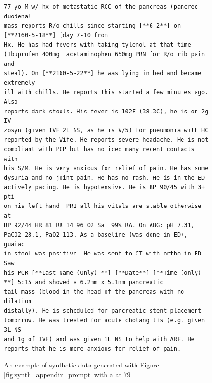 \begin{figure}[hbt]
    \centering
    \begin{Verbatim}[breaklines=true, frame=single]
77 yo M w/ hx of metastatic RCC of the pancreas (pancreo-duodenal
mass reports R/o chills since starting [**6-2**] on [**2160-5-18**] (day 7-10 from
Hx. He has had fevers with taking tylenol at that time
(Ibuprofen 400mg, acetaminophen 650mg PRN for R/o rib pain and
steal). On [**2160-5-22**] he was lying in bed and became extremely
ill with chills. He reports this started a few minutes ago. Also
reports dark stools. His fever is 102F (38.3C), he is on 2g IV
zosyn (given IVF 2L NS, as he is V/5) for pneumonia with HC
reported by the Wife. He reports severe headache. He is not
compliant with PCP but has noticed many recent contacts with
his S/M. He is very anxious for relief of pain. He has some
dysuria and no joint pain. He has no rash. He is in the ED
actively pacing. He is hypotensive. He is BP 90/45 with 3+ pti
on his left hand. PRI all his vitals are stable otherwise at
BP 92/44 HR 81 RR 14 96 O2 Sat 99% RA. On ABG: pH 7.31,
PaCO2 28.1, PaO2 113. As a baseline (was done in ED), guaiac
in stool was positive. He was sent to CT with ortho in ED. Saw
his PCR [**Last Name (Only) **] [**Date**] [**Time (only) **] 5:15 and showed a 6.2mm x 5.1mm pancreatic
tail mass (blood in the head of the pancreas with no dilation
distally). He is scheduled for pancreatic stent placement
tomorrow. He was treated for acute cholangitis (e.g. given 3L NS
and 1g of IVF) and was given 1L NS to help with ARF. He
reports that he is more anxious for relief of pain.
    \end{Verbatim}
    \caption{An example of synthetic data generated with Figure \ref{fig:synth_appendix_prompt} with a \score at $79$}
    \label{fig:synth_appendix_best}
\end{figure}
